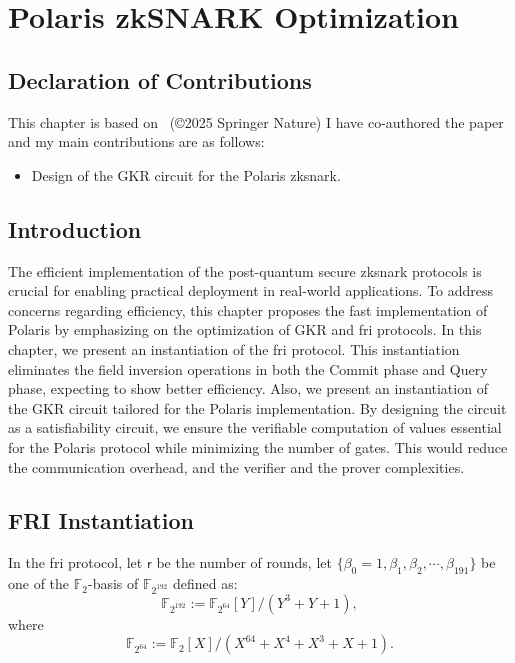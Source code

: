 \chapter{Polaris zkSNARK Optimization}\label{ch:polaris}

\section*{Declaration of Contributions}
This chapter is based on~\cite{Badakhshan2025Ursa} (\copyright \hspace{.1em}2025 Springer Nature) I have co-authored the paper and my main contributions are as follows:
\begin{itemize}
	\item Design of the GKR circuit for the Polaris \gls{zksnark}.
\end{itemize}

\section{Introduction}
The efficient implementation of the  post-quantum secure \gls{zksnark} protocols is crucial for enabling practical deployment in real-world applications. To address concerns regarding efficiency, this chapter proposes the fast implementation of Polaris by emphasizing on the optimization of GKR and \gls{fri} protocols.  In this chapter, we present an instantiation of the \gls{fri} protocol. This instantiation eliminates the field inversion operations in both the Commit phase and Query phase, expecting to show  better efficiency. Also, we present an instantiation of the GKR circuit tailored for the Polaris implementation. By designing the circuit as a  satisfiability circuit, we ensure the verifiable computation of values essential for the Polaris protocol while minimizing the number of gates. This would reduce the communication overhead, and the verifier and the prover complexities.

\section{FRI Instantiation}
\label{sec:FRI_instantiation}

In the \gls{fri} protocol, let $\mathsf{r}$ be the number of rounds, let $\{\beta_0 = 1, \beta_1, \beta_2,\cdots, \beta_{191}\}$ be one of the $\mathbb{F}_2$-basis of $\mathbb{F}_{2^{192}}$ defined as:
\begin{equation}\label{eq_F_2_192}
	\mathbb{F}_{2^{192}} := \mathbb{F}_{2^{64}}[Y]/(Y^3 + Y + 1),
\end{equation}
where
\begin{equation}\label{eq_F_2_64}
	\mathbb{F}_{2^{64}} := \mathbb{F}_{2}[X]/(X^{64} + X^4 + X^3 + X + 1).
\end{equation}
\newline

